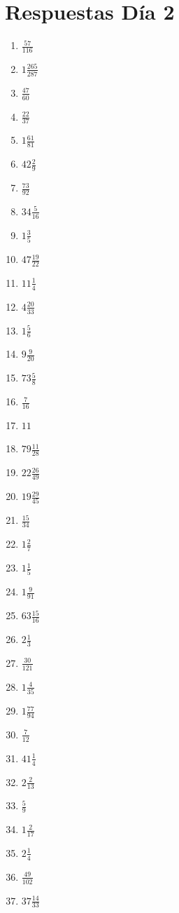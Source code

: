\documentclass[12pt]{article}
\begin{document}
\section*{Respuestas Día 2}
\begin{enumerate}
\item $ \frac{57}{116} $
\item $ 1 \frac{265}{287} $
\item $ \frac{47}{60} $
\item $ \frac{22}{37} $
\item $ 1 \frac{61}{81} $
\item $ 42 \frac{2}{9} $
\item $ \frac{73}{92} $
\item $ 34 \frac{5}{16} $
\item $ 1 \frac{3}{5} $
\item $ 47 \frac{19}{22} $
\item $ 11 \frac{1}{4} $
\item $ 4 \frac{20}{33} $
\item $ 1 \frac{5}{6} $
\item $ 9 \frac{9}{20} $
\item $ 73 \frac{5}{8} $
\item $ \frac{7}{16} $
\item $ 11 $
\item $ 79 \frac{11}{28} $
\item $ 22 \frac{26}{49} $
\item $ 19 \frac{29}{45} $
\item $ \frac{15}{34} $
\item $ 1 \frac{2}{7} $
\item $ 1 \frac{1}{5} $
\item $ 1 \frac{9}{91} $
\item $ 63 \frac{15}{16} $
\item $ 2 \frac{1}{3} $
\item $ \frac{30}{121} $
\item $ 1 \frac{4}{35} $
\item $ 1 \frac{77}{94} $
\item $ \frac{7}{12} $
\item $ 41 \frac{1}{4} $
\item $ 2 \frac{2}{13} $
\item $ \frac{5}{9} $
\item $ 1 \frac{2}{17} $
\item $ 2 \frac{1}{4} $
\item $ \frac{49}{102} $
\item $ 37 \frac{14}{33} $

\end{enumerate}
\end{document}
